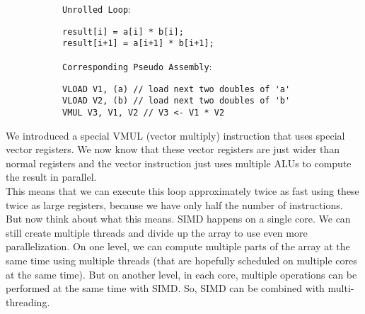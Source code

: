 \documentclass[main.tex]{subfiles}
\begin{document}
\begin{figure}[H]
    \begin{subfigure}[t]{.5\textwidth}
        \texttt{Unrolled Loop}:
        \begin{verbatim}
result[i] = a[i] * b[i];
result[i+1] = a[i+1] * b[i+1];
        \end{verbatim}
    \end{subfigure}%
    \begin{subfigure}[t]{.6\textwidth}
        \texttt{Corresponding Pseudo Assembly}:
        \begin{verbatim}
VLOAD V1, (a) // load next two doubles of 'a'
VLOAD V2, (b) // load next two doubles of 'b'
VMUL V3, V1, V2 // V3 <- V1 * V2
        \end{verbatim}
    \end{subfigure}
\end{figure}
\noindent We introduced a special VMUL (vector multiply) instruction that uses special vector registers. We now know that these vector registers are just wider than normal registers and the vector instruction just uses multiple ALUs to compute the result in parallel.\\[3mm] This means that we can execute this loop approximately twice as fast using these twice as large registers, because we have only half the number of instructions.\\
But now think about what this means. SIMD happens on a single core. We can still create multiple threads and divide up the array to use even more parallelization. On one level, we can compute multiple parts of the array at the same time using multiple threads (that are hopefully scheduled on multiple cores at the same time). But on another level, in each core, multiple operations can be performed at the same time with SIMD. So, SIMD can be combined with multi-threading.
\end{document}
